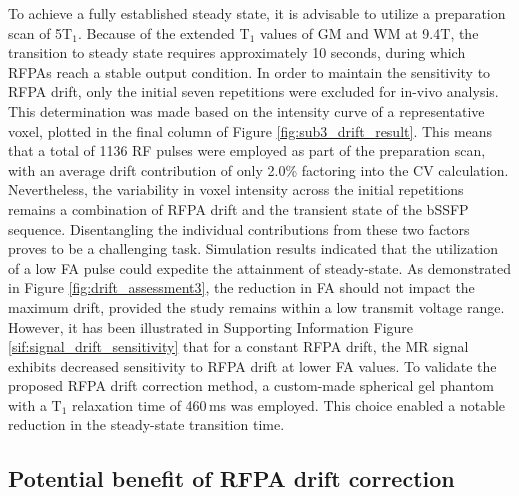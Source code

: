To achieve a fully established steady state, it is advisable to utilize a preparation scan of 5T$_1$\cite{bieri2013fundamentals}. Because of the extended T$_1$ values of GM and WM at 9.4T\cite{zhu2014relaxation}, the transition to steady state requires approximately 10 seconds, during which RFPAs reach a stable output condition. In order to maintain the sensitivity to RFPA drift, only the initial seven repetitions were excluded for in-vivo analysis. This determination was made based on the intensity curve of a representative voxel, plotted in the final column of Figure \ref{fig:sub3_drift_result}. This means that a total of 1136 RF pulses were employed as part of the preparation scan, with an average drift contribution of only 2.0\% factoring into the CV calculation. Nevertheless, the variability in voxel intensity across the initial repetitions remains a combination of RFPA drift and the transient state of the bSSFP sequence. Disentangling the individual contributions from these two factors proves to be a challenging task. Simulation results indicated that the utilization of a low FA pulse could expedite the attainment of steady-state. As demonstrated in Figure \ref{fig:drift_assessment3}, the reduction in FA should not impact the maximum drift, provided the study remains within a low transmit voltage range. However, it has been illustrated in Supporting Information Figure \ref{sif:signal_drift_sensitivity} that for a constant RFPA drift, the MR signal exhibits decreased sensitivity to RFPA drift at lower FA values. To validate the proposed RFPA drift correction method, a custom-made spherical gel phantom with a $\text{T}_1$ relaxation time of 460\,ms was employed. This choice enabled a notable reduction in the steady-state transition time.

\subsection{Potential benefit of RFPA drift correction}

